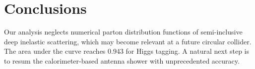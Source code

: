 \section{Conclusions}\label{sec:conclusions}

Our analysis neglects numerical parton distribution functions of
semi-inclusive deep inelastic scattering, which may become relevant at a
future circular collider. The area under the curve reaches 0.943 for
Higgs tagging. A natural next step is to resum the calorimeter-based
antenna shower with unprecedented accuracy.

